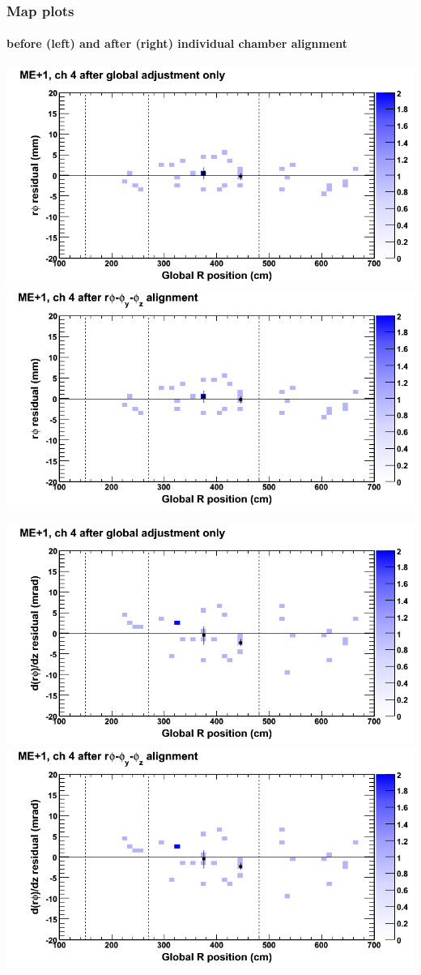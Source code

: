 \documentclass[compress]{beamer}
\begin{document}
\begin{frame}
\frametitle{Map plots}
\framesubtitle{before (left) and after (right) individual chamber alignment}
\includegraphics[width=0.5\linewidth]{ringmapplots_3dof/before_CSCvsr_mep1ch04_x.png} \includegraphics[width=0.5\linewidth]{ringmapplots_3dof/after_CSCvsr_mep1ch04_x.png}

\includegraphics[width=0.5\linewidth]{ringmapplots_3dof/before_CSCvsr_mep1ch04_dxdz.png} \includegraphics[width=0.5\linewidth]{ringmapplots_3dof/after_CSCvsr_mep1ch04_dxdz.png}
\end{frame}
\end{document}
